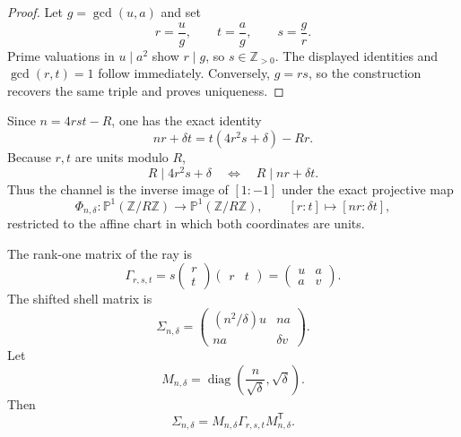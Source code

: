 \documentclass[11pt]{article}
\theoremstyle{definition}
\theoremstyle{remark}
\newcommand{\Z}{\mathbb Z}
\newcommand{\Pone}{\mathbb P^1}
\newcommand{\diag}{\operatorname{diag}}
\newcommand{\1}{\mathbf 1}
\newcommand{\mat}[4]{\begin{pmatrix}#1&#2\\#3&#4\end{pmatrix}}
\begin{document}
\begin{proof}
Let $g=\gcd(u,a)$ and set
\[
 r=\frac ug,\qquad t=\frac ag,\qquad s=\frac gr.
\]
Prime valuations in $u\mid a^2$ show $r\mid g$, so $s\in\Z_{>0}$.
The displayed identities and $\gcd(r,t)=1$ follow immediately.  Conversely,
$g=rs$, so the construction recovers the same triple and proves uniqueness.
\end{proof}

Since $n=4rst-R$, one has the exact identity
\begin{equation}\label{eq:projective-identity}
 nr+\delta t=t(4r^2s+\delta)-Rr.
\end{equation}
Because $r,t$ are units modulo $R$,
\begin{equation}\label{eq:projective-incidence}
 \boxed{R\mid4r^2s+\delta
 \quad\Longleftrightarrow\quad R\mid nr+\delta t.}
\end{equation}
Thus the channel is the inverse image of $[1:-1]$ under the exact projective
map
\begin{equation}\label{eq:projective-map}
 \Phi_{n,\delta}:\Pone(\Z/R\Z)\longrightarrow\Pone(\Z/R\Z),
 \qquad [r:t]\longmapsto[nr:\delta t],
\end{equation}
restricted to the affine chart in which both coordinates are units.

The rank-one matrix of the ray is
\begin{equation}\label{eq:Gamma-ray}
 \Gamma_{r,s,t}
 =s\begin{pmatrix}r\\t\end{pmatrix}
   \begin{pmatrix}r&t\end{pmatrix}
 =\mat{u}{a}{a}{v}.
\end{equation}
The shifted shell matrix is
\begin{equation}\label{eq:Sigma-channel}
 \Sigma_{n,\delta}
 =\mat{(n^2/\delta)u}{na}{na}{\delta v}.
\end{equation}
Let
\begin{equation}\label{eq:Mndelta}
 M_{n,\delta}=\diag\left(\frac n{\sqrt\delta},\sqrt\delta\right).
\end{equation}
Then
\begin{equation}\label{eq:congruence-action}
 \boxed{\Sigma_{n,\delta}
 =M_{n,\delta}\Gamma_{r,s,t}M_{n,\delta}^{\mathsf T}.}
\end{equation}
\end{document}
